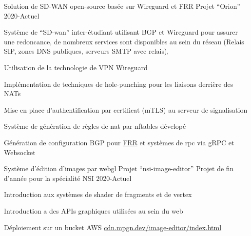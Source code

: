 
\begin{cventries}
  \cventry
    {Solution de SD-WAN open-source basée sur Wireguard et FRR}
    {Projet ``Orion''}
    {}
    {2020-Actuel}
    {
      \begin{cvitems}
        \item {Système de ``SD-wan'' inter-étudiant utilisant BGP et Wireguard pour assurer une redoncance,
        de nombreux services sont disponibles au sein du réseau (Relais SIP, zones DNS publiques, serveurs SMTP avec relais), 
        }
        \item {Utilisation de la technologie de VPN Wireguard}
        \item {Implémentation de techniques de hole-punching pour les liaisons derrière des NATs}
        \item {Mise en place d'authentification par certificat (mTLS) au serveur de signalisation}
        \item {Système de génération de règles de nat par nftables dévelopé}
        \item {Génération de configuration BGP pour \href{https://github.com/FRRouting/frr.git}{FRR} et systèmes de rpc via gRPC et Websocket}
      \end{cvitems}
    }

  \cventry
    {Système d'édition d'images par webgl}
    {Projet ``nsi-image-editor''}
    {Projet de fin d'année pour la spécialité NSI}
    {2020-Actuel}
    {
      \begin{cvitems}
        \item {Introduction aux systèmes de shader de fragments et de vertex} 
        \item {Introduction a des APIs graphiques utilisées au sein du web}
        \item {Déploiement sur un bucket AWS \href{https://cdn.mpgn.dev/image-editor/index.html}{cdn.mpgn.dev/image-editor/index.html}}
      \end{cvitems}
    }
\end{cventries}
